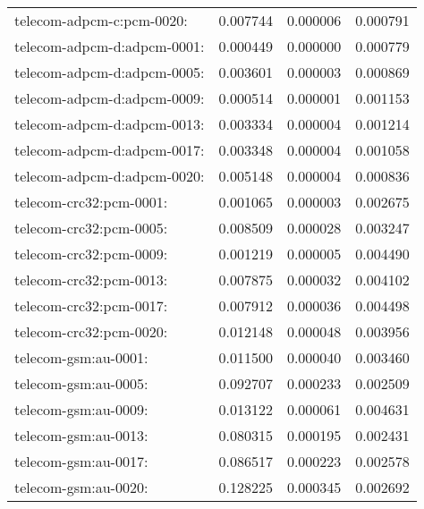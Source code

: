 \begin{longtable}{lrrr}
telecom-adpcm-c:pcm-0020: & 0.007744 & 0.000006 & 0.000791 \\
telecom-adpcm-d:adpcm-0001: & 0.000449 & 0.000000 & 0.000779 \\
telecom-adpcm-d:adpcm-0005: & 0.003601 & 0.000003 & 0.000869 \\
telecom-adpcm-d:adpcm-0009: & 0.000514 & 0.000001 & 0.001153 \\
telecom-adpcm-d:adpcm-0013: & 0.003334 & 0.000004 & 0.001214 \\
telecom-adpcm-d:adpcm-0017: & 0.003348 & 0.000004 & 0.001058 \\
telecom-adpcm-d:adpcm-0020: & 0.005148 & 0.000004 & 0.000836 \\
telecom-crc32:pcm-0001: & 0.001065 & 0.000003 & 0.002675 \\
telecom-crc32:pcm-0005: & 0.008509 & 0.000028 & 0.003247 \\
telecom-crc32:pcm-0009: & 0.001219 & 0.000005 & 0.004490 \\
telecom-crc32:pcm-0013: & 0.007875 & 0.000032 & 0.004102 \\
telecom-crc32:pcm-0017: & 0.007912 & 0.000036 & 0.004498 \\
telecom-crc32:pcm-0020: & 0.012148 & 0.000048 & 0.003956 \\
telecom-gsm:au-0001: & 0.011500 & 0.000040 & 0.003460 \\
telecom-gsm:au-0005: & 0.092707 & 0.000233 & 0.002509 \\
telecom-gsm:au-0009: & 0.013122 & 0.000061 & 0.004631 \\
telecom-gsm:au-0013: & 0.080315 & 0.000195 & 0.002431 \\
telecom-gsm:au-0017: & 0.086517 & 0.000223 & 0.002578 \\
telecom-gsm:au-0020: & 0.128225 & 0.000345 & 0.002692 \\
\end{longtable}
